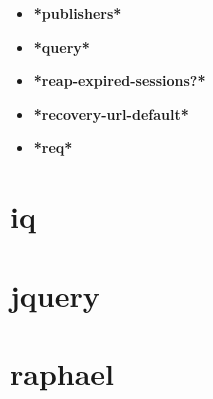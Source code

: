 \documentclass [11pt]{book}
\begin{document}
\begin{itemize}
\item {}
\label{prim:*publishers*}
\textbf{*publishers*}





\item {}
\label{prim:*query*}
\textbf{*query*}





\item {}
\label{prim:*reap-expired-sessions?*}
\textbf{*reap-expired-sessions?*}





\item {}
\label{prim:*recovery-url-default*}
\textbf{*recovery-url-default*}





\item {}
\label{prim:*req*}
\textbf{*req*}





\end{itemize}





\section{iq }

\label{sec:iq}







\section{jquery }

\label{sec:jquery}







\section{raphael }

\label{sec:raphael}
\end{document}
